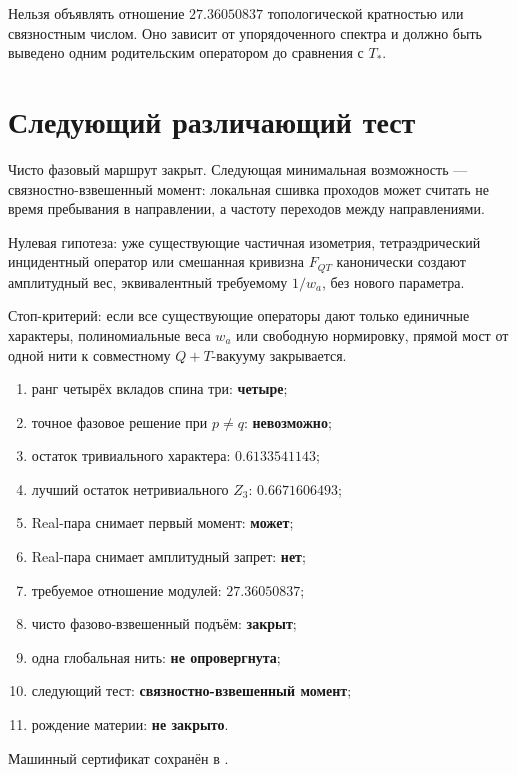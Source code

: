 \begin{nogocriterion}
Нельзя объявлять отношение $27.36050837$ топологической кратностью или
связностным числом. Оно зависит от упорядоченного спектра и должно быть
выведено одним родительским оператором до сравнения с $T_*$.
\end{nogocriterion}

\section{Следующий различающий тест}

Чисто фазовый маршрут закрыт. Следующая минимальная возможность ---
связностно-взвешенный момент: локальная сшивка проходов может считать не
время пребывания в направлении, а частоту переходов между направлениями.

Нулевая гипотеза: уже существующие частичная изометрия, тетраэдрический
инцидентный оператор или смешанная кривизна $F_{QT}$ канонически создают
амплитудный вес, эквивалентный требуемому $1/w_a$, без нового параметра.

Стоп-критерий: если все существующие операторы дают только единичные
характеры, полиномиальные веса $w_a$ или свободную нормировку, прямой мост
от одной нити к совместному $Q+T$-вакууму закрывается.

\begin{protocol}
\begin{enumerate}
 \item ранг четырёх вкладов спина три: \textbf{четыре};
 \item точное фазовое решение при $p\ne q$: \textbf{невозможно};
 \item остаток тривиального характера: \textbf{$0.6133541143$};
 \item лучший остаток нетривиального $Z_3$: \textbf{$0.6671606493$};
 \item Real-пара снимает первый момент: \textbf{может};
 \item Real-пара снимает амплитудный запрет: \textbf{нет};
 \item требуемое отношение модулей: \textbf{$27.36050837$};
 \item чисто фазово-взвешенный подъём: \textbf{закрыт};
 \item одна глобальная нить: \textbf{не опровергнута};
 \item следующий тест: \textbf{связностно-взвешенный момент};
 \item рождение материи: \textbf{не закрыто}.
\end{enumerate}
\end{protocol}

Машинный сертификат сохранён в
.